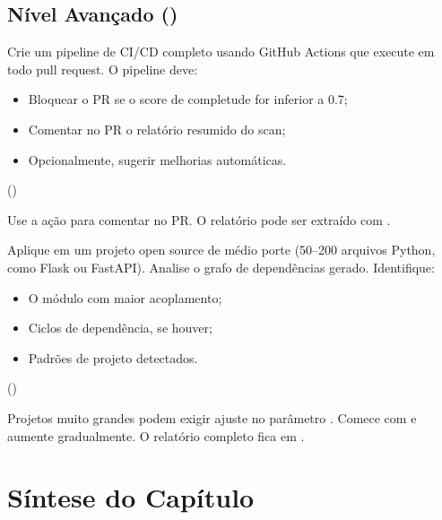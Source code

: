 \subsection{Nível Avançado (\nivelavancado)}
\label{subsec:ex-avancado}

\begin{exercicio}
Crie um pipeline de CI/CD completo usando GitHub Actions que
execute  em todo pull request. O pipeline
deve:
\begin{itemize}
\item Bloquear o PR se o score de completude for inferior a 0.7;
\item Comentar no PR o relatório resumido do scan;
\item Opcionalmente, sugerir melhorias automáticas.
\end{itemize}
(\nivelavancado)

 Use a ação  para
comentar no PR. O relatório pode ser extraído com
.
\end{exercicio}

\begin{exercicio}
Aplique  em um projeto open source de médio porte
(50--200 arquivos Python, como Flask ou FastAPI). Analise o grafo
de dependências gerado. Identifique:
\begin{itemize}
\item O módulo com maior acoplamento;
\item Ciclos de dependência, se houver;
\item Padrões de projeto detectados.
\end{itemize}
(\nivelavancado)

 Projetos muito grandes podem exigir ajuste no
parâmetro . Comece com  e
aumente gradualmente. O relatório completo fica em
.
\end{exercicio}

\section*{Síntese do Capítulo}
\label{sec:sintese}

